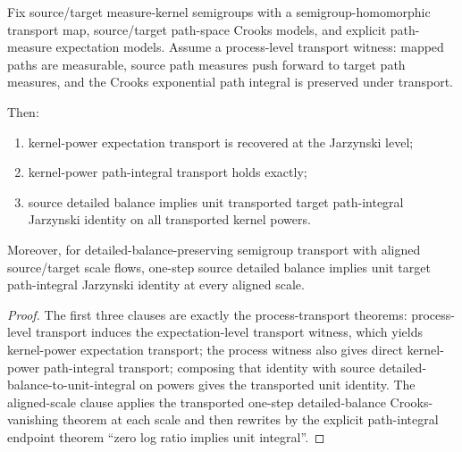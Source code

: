 \begin{theorem}\label{thm:path-process-transport-endpoint}
Fix source/target measure-kernel semigroups with a semigroup-homomorphic transport map, source/target path-space Crooks models, and explicit path-measure expectation models. Assume a process-level transport witness: mapped paths are measurable, source path measures push forward to target path measures, and the Crooks exponential path integral is preserved under transport.

Then:
\begin{enumerate}
\item kernel-power expectation transport is recovered at the Jarzynski level;
\item kernel-power path-integral transport holds exactly;
\item source detailed balance implies unit transported target path-integral Jarzynski identity on all transported kernel powers.
\end{enumerate}

Moreover, for detailed-balance-preserving semigroup transport with aligned source/target scale flows, one-step source detailed balance implies unit target path-integral Jarzynski identity at every aligned scale.
\end{theorem}

\begin{proof}
The first three clauses are exactly the process-transport theorems: process-level transport induces the expectation-level transport witness, which yields kernel-power expectation transport; the process witness also gives direct kernel-power path-integral transport; composing that identity with source detailed-balance-to-unit-integral on powers gives the transported unit identity. The aligned-scale clause applies the transported one-step detailed-balance Crooks-vanishing theorem at each scale and then rewrites by the explicit path-integral endpoint theorem ``zero log ratio implies unit integral''.
\end{proof}

